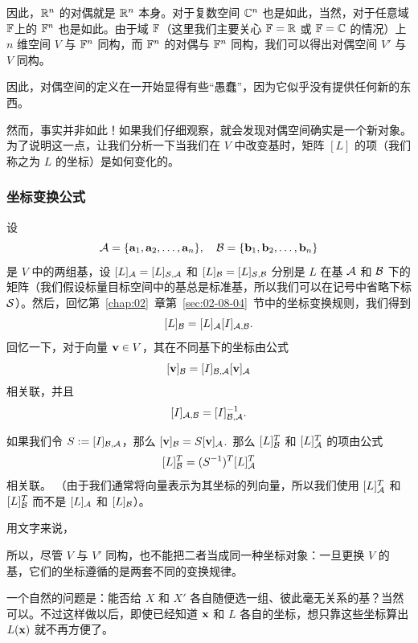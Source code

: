 因此，$\mathbb{R}^n$ 的对偶就是 $\mathbb{R}^n$ 本身。对于复数空间 $\mathbb{C}^n$ 也是如此，当然，对于任意域$\mathbb{F}$上的 $\mathbb{F}^n$ 也是如此。由于域 $\mathbb{F}$（这里我们主要关心 $\mathbb{F} = \mathbb{R}$ 或 $\mathbb{F} = \mathbb{C}$ 的情况）上 $n$ 维空间 $V$ 与 $\mathbb{F}^n$ 同构，而 $\mathbb{F}^n$ 的对偶与 $\mathbb{F}^n$ 同构，我们可以得出对偶空间 $V'$ 与 $V$ 同构。

因此，对偶空间的定义在一开始显得有些“愚蠢”，因为它似乎没有提供任何新的东西。

然而，事实并非如此！如果我们仔细观察，就会发现对偶空间确实是一个新对象。为了说明这一点，让我们分析一下当我们在 $V$ 中改变基时，矩阵 $[L]$ 的项（我们称之为 $L$ 的坐标）是如何变化的。

\subsubsection{坐标变换公式}\label{sec:08-01-01-01}
设
$$\mathcal{A} = \{\mathbf{a}_1, \mathbf{a}_2, \dots, \mathbf{a}_n\},\quad \mathcal{B} = \{\mathbf{b}_1, \mathbf{b}_2, \dots, \mathbf{b}_n\}$$
是 $V$ 中的两组基，设 $[L]_{\mathcal{A}} = [L]_{\mathcal{S},\mathcal{A}}$ 和 $[L]_{\mathcal{B}} = [L]_{\mathcal{S},\mathcal{B}}$ 分别是 $L$ 在基 $\mathcal{A}$ 和 $\mathcal{B}$ 下的矩阵（我们假设标量目标空间中的基总是标准基，所以我们可以在记号中省略下标 $\mathcal{S}$）。然后，回忆第~\ref{chap:02}~章第~\ref{sec:02-08-04}~节中的坐标变换规则，我们得到
$$[L]_{\mathcal{B}} = [L]_{\mathcal{A}} [I]_{\mathcal{A},\mathcal{B}}.$$
回忆一下，对于向量 $\mathbf{v} \in V$，其在不同基下的坐标由公式
$$[\mathbf{v}]_{\mathcal{B}} = [I]_{\mathcal{B},\mathcal{A}} [\mathbf{v}]_{\mathcal{A}}$$
相关联，并且
$$[I]_{\mathcal{A},\mathcal{B}} = [I]_{\mathcal{B},\mathcal{A}}^{-1}.$$

如果我们令 $S := [I]_{\mathcal{B},\mathcal{A}}$，那么 $[\mathbf{v}]_{\mathcal{B}} = S [\mathbf{v}]_{\mathcal{A}}$.~那么 $[L]^T_{\mathcal{B}}$ 和 $[L]^T_{\mathcal{A}}$ 的项由公式
\begin{equation}\label{eq:08-01-01}
[L]^T_{\mathcal{B}} = (S^{-1})^T [L]^T_{\mathcal{A}}
\end{equation}
相关联。
（由于我们通常将向量表示为其坐标的列向量，所以我们使用 $[L]^T_{\mathcal{A}}$ 和 $[L]^T_{\mathcal{B}}$ 而不是 $[L]_{\mathcal{A}}$ 和 $[L]_{\mathcal{B}}$）。

用文字来说，


所以，尽管 $V$ 与 $V'$ 同构，也不能把二者当成同一种坐标对象：一旦更换 $V$ 的基，它们的坐标遵循的是两套不同的变换规律。

\begin{remark*}
一个自然的问题是：能否给 $X$ 和 $X'$ 各自随便选一组、彼此毫无关系的基？当然可以。不过这样做以后，即使已经知道 $\mathbf{x}$ 和 $L$ 各自的坐标，想只靠这些坐标算出 $L(\mathbf{x})$ 就不再方便了。
\end{remark*}

